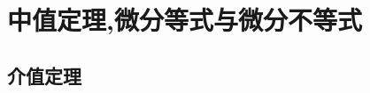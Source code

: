 \documentclass[8pt a4paper, oneside, UTF8]{ctexbook}  %
\begin{document}
\begin{sloppypar}
    \else
    \fi
    \chapter{中值定理,微分等式与微分不等式}
    \section{介值定理}
    \ifx\allfiles\undefined
\end{sloppypar}
\end{document}
